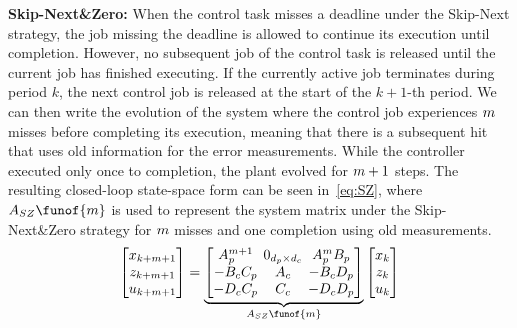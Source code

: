 \textbf{Skip-Next\&Zero: }%
%
When the control task misses a deadline under the Skip-Next strategy, the job missing the deadline is allowed to continue its execution until completion.
However, no subsequent job of the control task is released until the current job has finished executing.
If the currently active job terminates during period $k$, the next control job is released at the start of the $k+1$-th period.
We can then write the evolution of the system where the control job experiences $m$ misses before completing its execution, meaning that there is a subsequent hit that uses old information for the error measurements.
While the controller executed only once to completion, the plant evolved for $m+1$ steps.
The resulting closed-loop state-space form can be seen in~\eqref{eq:SZ}, where $A_{SZ}\funof{\nummisses}$ is used to represent the system matrix under the Skip-Next\&Zero strategy for $m$ misses and one completion using old measurements.
%
\begin{equation}
\setlength\arraycolsep{2pt}
\label{eq:SZ}
    \begin{bmatrix}
        x_{k+\nummisses+1} \\
        z_{k+\nummisses+1} \\
        u_{k+\nummisses+1}
    \end{bmatrix} = 
    \underbrace{\begin{bmatrix}
        A_p^{\nummisses+1}  & 0_{\numstatesplant \times \numstatesctl}  & A_p^\nummisses B_p \\
        -B_cC_p             & A_c                                       & -B_cD_p \\
        -D_cC_p             & C_c                                       & -D_cD_p
    \end{bmatrix}}_{A_{SZ}\funof{\nummisses}}
    \begin{bmatrix}
        x_{k} \\
        z_{k} \\
        u_{k}
    \end{bmatrix}
\end{equation}

